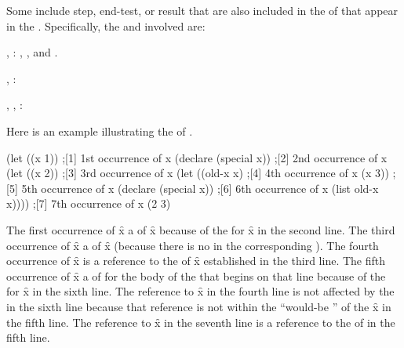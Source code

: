 Some  include step, end-test, or result 
 that are also included in the 
of  that appear in the .
Specifically, the  and  involved
are:

\beginlist
\item{\bull} , :  
  , , and .
\item{\bull} , :
\item{\bull} , , :
\endlist
{}


Here is an example illustrating the  of .

\code
 (let ((x 1))                ;[1] 1st occurrence of x
   (declare (special x))     ;[2] 2nd occurrence of x
   (let ((x 2))              ;[3] 3rd occurrence of x
     (let ((old-x x)         ;[4] 4th occurrence of x
           (x 3))            ;[5] 5th occurrence of x
       (declare (special x)) ;[6] 6th occurrence of x
       (list old-x x))))     ;[7] 7th occurrence of x
\EV (2 3)
\endcode

The first occurrence of \f{x}  a 
of \f{x} because of the   for \f{x}
in the second line.  The third occurrence of \f{x}  a
 of \f{x} (because there is no 
 in the corresponding  ).
The fourth occurrence of \f{x}  is a reference to the
 of \f{x} established in the third line.
The fifth occurrence of \f{x}  a 
of  for the body of the   that begins on
that line because of the   for \f{x}
in the sixth line. The reference to \f{x} in the fourth line is not
affected by the   in the sixth line 
because that reference is not within the ``would-be ''
of the  \f{x} in the fifth line.  The reference to \f{x}
in the seventh line is a reference to the  of 
 in the fifth line.



